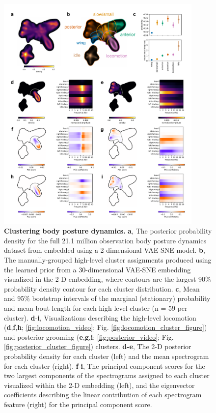 \begin{figure}[!htb]
\includegraphics[width=0.9\textwidth]{Graving_IMPRS_Thesis/figures/cluster_figure.pdf}
\centering

\caption{  \textbf{Clustering body posture dynamics.} \textbf{a}, The posterior probability density for the full 21.1 million observation body posture dynamics dataset from \cite{berman2014mapping, berman2016predictability, pereira2019fast} embedded using a 2-dimensional VAE-SNE model. \textbf{b}, The manually-grouped high-level cluster assignments produced using the learned prior from a 30-dimensional VAE-SNE embedding visualized in the 2-D embedding, where contours are the largest 90\% probability density contour for each cluster distribution. \textbf{c}, Mean and 95\% bootstrap intervals of the marginal (stationary) probability and mean bout length for each high-level cluster (n = 59 per cluster). \textbf{d}-\textbf{i}, Visualizations describing the high-level locomotion (\textbf{d},\textbf{f},\textbf{h}; \ref{fig:locomotion_video}; Fig. \ref{fig:locomotion_cluster_figure}) and posterior grooming (\textbf{e},\textbf{g},\textbf{i}; \ref{fig:posterior_video}; Fig. \ref{fig:posterior_cluster_figure}) clusters. \textbf{d-e}, The 2-D posterior probability density for each cluster (left) and the mean spectrogram for each cluster (right). \textbf{f}-\textbf{i}, The principal component scores for the two largest components of the spectrograms assigned to each cluster visualized within the 2-D embedding (left), and the eigenvector coefficients describing the linear contribution of each spectrogram feature (right) for the principal component score.}
\label{fig:cluster_figure}
\end{figure}



